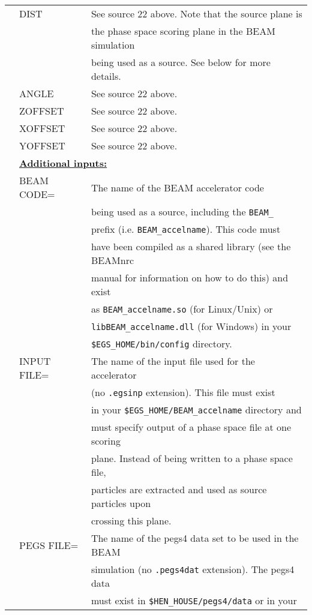 \begin{longtable}{lll}
  & DIST & See source 22 above.  Note that the source plane is\\
  &      & the phase space scoring plane in the BEAM simulation\\
  &      & being used as a source.  See below for more details.\\ 
  & ANGLE & See source 22 above.\\
  & ZOFFSET & See source 22 above.\\
  & XOFFSET & See source 22 above.\\
  & YOFFSET & See source 22 above.\\
& \multicolumn{2}{l}{\bf \underline {Additional inputs:}}\\
  & BEAM CODE= & The name of the BEAM accelerator code\\
  &            & being used as a source, including the {\tt BEAM\_}\\
  &            & prefix (i.e. {\tt BEAM\_accelname}).  This code must\\
  &            & have been compiled as a shared library (see the BEAMnrc\\
  &            & manual for information on how to do this) and exist\\
  &            & as {\tt BEAM\_accelname.so} (for Linux/Unix) or\\
  &            & {\tt libBEAM\_accelname.dll} (for Windows) in your\\
  &            & {\tt \$EGS\_HOME/bin/config} directory.\\ 
  & INPUT FILE= & The name of the input file used for the accelerator\\
  &             & (no {\tt .egsinp} extension).  This file must exist\\
  &             & in your {\tt \$EGS\_HOME/BEAM\_accelname} directory and\\
  &             & must specify output of a phase space file at one scoring\\
  &             & plane.  Instead of being written to a phase space file,\\
  &             & particles are extracted and used as source particles upon\\
  &             & crossing this plane.\\
  & PEGS FILE= & The name of the pegs4 data set to be used in the BEAM\\
  &            & simulation (no {\tt .pegs4dat} extension).  The pegs4 data\\
  &            & must exist in {\tt \$HEN\_HOUSE/pegs4/data} or in your\\

\end{longtable}
